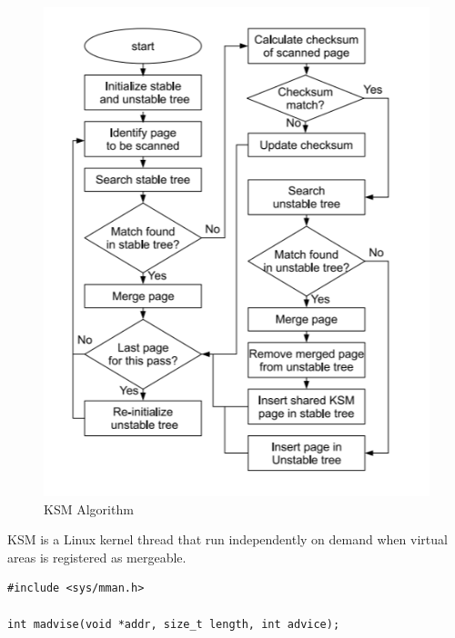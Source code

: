 \begin{figure}[H]
  \centering
  \includegraphics[width=\linewidth]{_summaries/deduplication/_images/ksm-algo.png}
  \caption{KSM Algorithm}
  \label{fig:ksm1}
\end{figure}

KSM is a Linux kernel thread that run independently on demand when virtual areas is registered as mergeable.

\begin{verbatim}
#include <sys/mman.h>

int madvise(void *addr, size_t length, int advice);
\end{verbatim}

